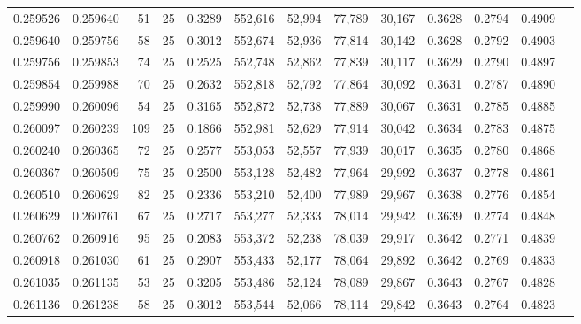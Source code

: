 \begin{tabular}{rrrrrrrrrrrrr}
0.259526 & 0.259640 &    51 &  25 &                                     0.3289 & 552,616 &  52,994 &  77,789 &  30,167 & 0.3628 & 0.2794 & 0.4909 \\
0.259640 & 0.259756 &    58 &  25 &                                     0.3012 & 552,674 &  52,936 &  77,814 &  30,142 & 0.3628 & 0.2792 & 0.4903 \\
0.259756 & 0.259853 &    74 &  25 &                                     0.2525 & 552,748 &  52,862 &  77,839 &  30,117 & 0.3629 & 0.2790 & 0.4897 \\
0.259854 & 0.259988 &    70 &  25 &                                     0.2632 & 552,818 &  52,792 &  77,864 &  30,092 & 0.3631 & 0.2787 & 0.4890 \\
0.259990 & 0.260096 &    54 &  25 &                                     0.3165 & 552,872 &  52,738 &  77,889 &  30,067 & 0.3631 & 0.2785 & 0.4885 \\
0.260097 & 0.260239 &   109 &  25 &                                     0.1866 & 552,981 &  52,629 &  77,914 &  30,042 & 0.3634 & 0.2783 & 0.4875 \\
0.260240 & 0.260365 &    72 &  25 &                                     0.2577 & 553,053 &  52,557 &  77,939 &  30,017 & 0.3635 & 0.2780 & 0.4868 \\
0.260367 & 0.260509 &    75 &  25 &                                     0.2500 & 553,128 &  52,482 &  77,964 &  29,992 & 0.3637 & 0.2778 & 0.4861 \\
0.260510 & 0.260629 &    82 &  25 &                                     0.2336 & 553,210 &  52,400 &  77,989 &  29,967 & 0.3638 & 0.2776 & 0.4854 \\
0.260629 & 0.260761 &    67 &  25 &                                     0.2717 & 553,277 &  52,333 &  78,014 &  29,942 & 0.3639 & 0.2774 & 0.4848 \\
0.260762 & 0.260916 &    95 &  25 &                                     0.2083 & 553,372 &  52,238 &  78,039 &  29,917 & 0.3642 & 0.2771 & 0.4839 \\
0.260918 & 0.261030 &    61 &  25 &                                     0.2907 & 553,433 &  52,177 &  78,064 &  29,892 & 0.3642 & 0.2769 & 0.4833 \\
0.261035 & 0.261135 &    53 &  25 &                                     0.3205 & 553,486 &  52,124 &  78,089 &  29,867 & 0.3643 & 0.2767 & 0.4828 \\
0.261136 & 0.261238 &    58 &  25 &                                     0.3012 & 553,544 &  52,066 &  78,114 &  29,842 & 0.3643 & 0.2764 & 0.4823 \\

\end{tabular}
